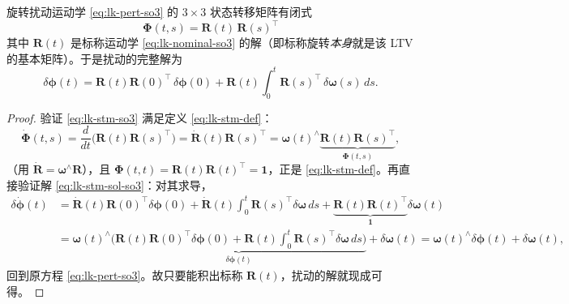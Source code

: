 \begin{theorem}[$\SO(3)$ 扰动的解析状态转移矩阵]\label{thm:lie-stm}
旋转扰动运动学 \cref{eq:lk-pert-so3} 的 $3\times3$ 状态转移矩阵有闭式
\begin{equation}
  \boxed{\;\boldsymbol{\Phi}(t,s)=\mathbf{R}(t)\,\mathbf{R}(s)^\top\;}
  \label{eq:lk-stm-so3}
\end{equation}
其中 $\mathbf{R}(t)$ 是标称运动学 \cref{eq:lk-nominal-so3} 的解（即标称旋转\emph{本身}就是该 LTV 的基本矩阵）。于是扰动的完整解为
\begin{equation}
  \delta\boldsymbol{\phi}(t)=\mathbf{R}(t)\mathbf{R}(0)^\top\,\delta\boldsymbol{\phi}(0)+\mathbf{R}(t)\!\int_0^t\mathbf{R}(s)^\top\,\delta\boldsymbol{\omega}(s)\,ds.
  \label{eq:lk-stm-sol-so3}
\end{equation}
\end{theorem}
\begin{proof}
验证 \cref{eq:lk-stm-so3} 满足定义 \cref{eq:lk-stm-def}：
\[
  \dot{\boldsymbol{\Phi}}(t,s)=\frac{d}{dt}\big(\mathbf{R}(t)\mathbf{R}(s)^\top\big)=\dot{\mathbf{R}}(t)\mathbf{R}(s)^\top=\boldsymbol{\omega}(t)^\wedge\underbrace{\mathbf{R}(t)\mathbf{R}(s)^\top}_{\boldsymbol{\Phi}(t,s)},
\]
（用 $\dot{\mathbf{R}}=\boldsymbol{\omega}^\wedge\mathbf{R}$），且 $\boldsymbol{\Phi}(t,t)=\mathbf{R}(t)\mathbf{R}(t)^\top=\mathbf{1}$，正是 \cref{eq:lk-stm-def}。再直接验证解 \cref{eq:lk-stm-sol-so3}：对其求导，
\begin{align*}
  \delta\dot{\boldsymbol{\phi}}(t)
  &=\dot{\mathbf{R}}(t)\mathbf{R}(0)^\top\delta\boldsymbol{\phi}(0)+\dot{\mathbf{R}}(t)\!\int_0^t\!\mathbf{R}(s)^\top\delta\boldsymbol{\omega}\,ds+\underbrace{\mathbf{R}(t)\mathbf{R}(t)^\top}_{\mathbf{1}}\delta\boldsymbol{\omega}(t)\\
  &=\boldsymbol{\omega}(t)^\wedge\underbrace{\Big(\mathbf{R}(t)\mathbf{R}(0)^\top\delta\boldsymbol{\phi}(0)+\mathbf{R}(t)\!\int_0^t\!\mathbf{R}(s)^\top\delta\boldsymbol{\omega}\,ds\Big)}_{\delta\boldsymbol{\phi}(t)}+\delta\boldsymbol{\omega}(t)
  =\boldsymbol{\omega}(t)^\wedge\delta\boldsymbol{\phi}(t)+\delta\boldsymbol{\omega}(t),
\end{align*}
回到原方程 \cref{eq:lk-pert-so3}。故只要能积出标称 $\mathbf{R}(t)$，扰动的解就现成可得。
\end{proof}

